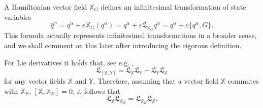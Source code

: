 \documentclass[
10pt, %
a4paper, %
oneside, %
headinclude,footinclude, %
BCOR5mm, %
]{scrartcl}
\newcommand{\XXXX}{\boldsymbol{\mathbb{X}}}
\newcommand{\YYYY}{\boldsymbol{\mathbb{Y}}}
\newcommand{\eps}{\varepsilon}
\newcommand{\Lie}{\mathfrak{L}}
\newcommand{\Gfunc}{G}
\begin{document}
A Hamiltonian vector field $\XXXX_\Gfunc$ defines an infinitesimal transformation 
of state variables 
\begin{equation}\label{eq.barq}
    \bar{q}^\alpha = q^\alpha + \eps \XXXX_\Gfunc(q^\alpha) = q^\alpha + \eps \Lie_{\XXXX_\Gfunc} q^\alpha = 
    q^\alpha 
    + \eps \{q^\alpha, \Gfunc\}.
\end{equation}
This formula actually represents infinitesimal transformations in a broader sense, and we shall comment on this later after introducing the rigorous definition.

For Lie derivatives it holds that, see e.g. \cite{Fecko},
\begin{equation}
    \Lie_{[\XXXX,\YYYY]} = \Lie_{\XXXX} \Lie_{\YYYY}-\Lie_{\YYYY} \Lie_{\XXXX}
\end{equation}
for any vector fields $\XXXX$ and $\YYYY$. Therefore, assuming that a vector field $\XXXX$ commutes with $\XXXX_E$, $[\XXXX,\XXXX_E]=0$, it follows that 
\begin{equation}\label{eq.LieLie}
\Lie_{\XXXX} \Lie_{\XXXX_E} = \Lie_{\XXXX_E} \Lie_{\XXXX}.
\end{equation}
\end{document}
